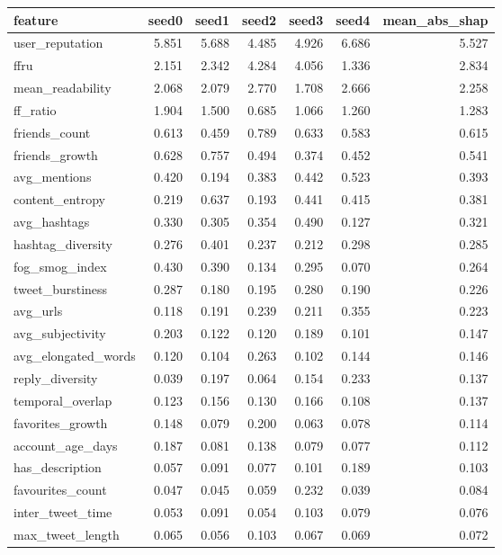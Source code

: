 \begin{tabular}{lrrrrrr}
\toprule
feature & seed0 & seed1 & seed2 & seed3 & seed4 & mean_abs_shap \\
\midrule
user_reputation & 5.851 & 5.688 & 4.485 & 4.926 & 6.686 & 5.527 \\
ffru & 2.151 & 2.342 & 4.284 & 4.056 & 1.336 & 2.834 \\
mean_readability & 2.068 & 2.079 & 2.770 & 1.708 & 2.666 & 2.258 \\
ff_ratio & 1.904 & 1.500 & 0.685 & 1.066 & 1.260 & 1.283 \\
friends_count & 0.613 & 0.459 & 0.789 & 0.633 & 0.583 & 0.615 \\
friends_growth & 0.628 & 0.757 & 0.494 & 0.374 & 0.452 & 0.541 \\
avg_mentions & 0.420 & 0.194 & 0.383 & 0.442 & 0.523 & 0.393 \\
content_entropy & 0.219 & 0.637 & 0.193 & 0.441 & 0.415 & 0.381 \\
avg_hashtags & 0.330 & 0.305 & 0.354 & 0.490 & 0.127 & 0.321 \\
hashtag_diversity & 0.276 & 0.401 & 0.237 & 0.212 & 0.298 & 0.285 \\
fog_smog_index & 0.430 & 0.390 & 0.134 & 0.295 & 0.070 & 0.264 \\
tweet_burstiness & 0.287 & 0.180 & 0.195 & 0.280 & 0.190 & 0.226 \\
avg_urls & 0.118 & 0.191 & 0.239 & 0.211 & 0.355 & 0.223 \\
avg_subjectivity & 0.203 & 0.122 & 0.120 & 0.189 & 0.101 & 0.147 \\
avg_elongated_words & 0.120 & 0.104 & 0.263 & 0.102 & 0.144 & 0.146 \\
reply_diversity & 0.039 & 0.197 & 0.064 & 0.154 & 0.233 & 0.137 \\
temporal_overlap & 0.123 & 0.156 & 0.130 & 0.166 & 0.108 & 0.137 \\
favorites_growth & 0.148 & 0.079 & 0.200 & 0.063 & 0.078 & 0.114 \\
account_age_days & 0.187 & 0.081 & 0.138 & 0.079 & 0.077 & 0.112 \\
has_description & 0.057 & 0.091 & 0.077 & 0.101 & 0.189 & 0.103 \\
favourites_count & 0.047 & 0.045 & 0.059 & 0.232 & 0.039 & 0.084 \\
inter_tweet_time & 0.053 & 0.091 & 0.054 & 0.103 & 0.079 & 0.076 \\
max_tweet_length & 0.065 & 0.056 & 0.103 & 0.067 & 0.069 & 0.072 \\

\end{tabular}
